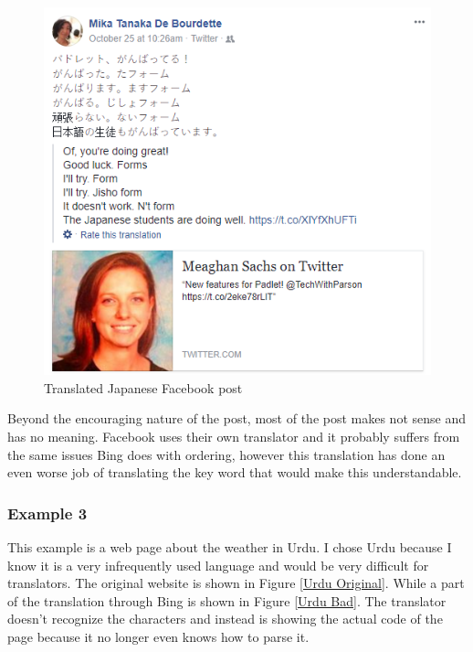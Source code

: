\documentclass[letterpaper,12pt]{article}
\begin{document}
\begin{figure}[h]
\centering
\includegraphics[scale=0.75]{data/FacebookExampleBadTranslation.png}
\caption{Translated Japanese Facebook post}
\label{bad FB translation}
\end{figure}

Beyond the encouraging nature of the post, most of the post makes not sense and has no meaning. Facebook uses their own translator and it probably suffers from the same issues Bing does with ordering, however this translation has done an even worse job of translating the key word that would make this understandable.

\subsubsection{Example 3}

This example is a web page about the weather in Urdu. I chose Urdu because I know it is a very infrequently used language and would be very difficult for translators. The original website is shown in Figure \ref{Urdu Original}. While a part of the translation through Bing is shown in Figure \ref{Urdu Bad}. The translator doesn't recognize the characters and instead is showing the actual code of the page because it no longer even knows how to parse it.
\end{document}

